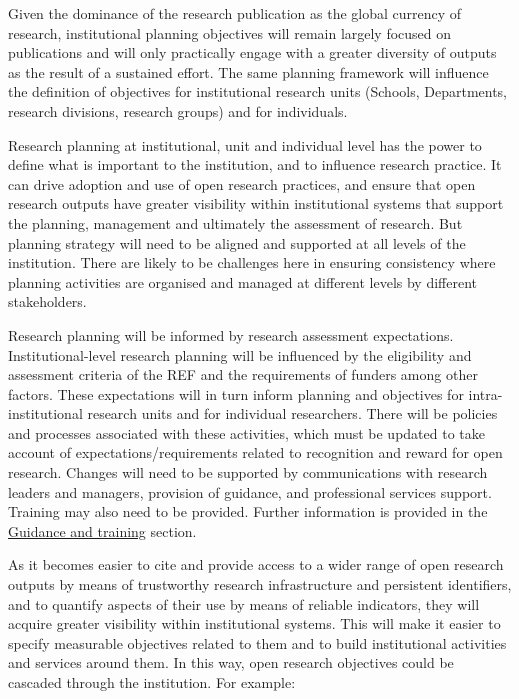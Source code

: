 \documentclass[
  letterpaper,
  DIV=11,
  numbers=noendperiod,
  oneside]{scrreprt}
\begin{document}
Given the dominance of the research publication as the global currency
of research, institutional planning objectives will remain largely
focused on publications and will only practically engage with a greater
diversity of outputs as the result of a sustained effort. The same
planning framework will influence the definition of objectives for
institutional research units (Schools, Departments, research divisions,
research groups) and for individuals.

Research planning at institutional, unit and individual level has the
power to define what is important to the institution, and to influence
research practice. It can drive adoption and use of open research
practices, and ensure that open research outputs have greater visibility
within institutional systems that support the planning, management and
ultimately the assessment of research. But planning strategy will need
to be aligned and supported at all levels of the institution. There are
likely to be challenges here in ensuring consistency where planning
activities are organised and managed at different levels by different
stakeholders.

Research planning will be informed by research assessment expectations.
Institutional-level research planning will be influenced by the
eligibility and assessment criteria of the REF and the requirements of
funders among other factors. These expectations will in turn inform
planning and objectives for intra-institutional research units and for
individual researchers. There will be policies and processes associated
with these activities, which must be updated to take account of
expectations/requirements related to recognition and reward for open
research. Changes will need to be supported by communications with
research leaders and managers, provision of guidance, and professional
services support. Training may also need to be provided. Further
information is provided in the \href{guide-07-training.qmd}{Guidance and
training} section.

As it becomes easier to cite and provide access to a wider range of open
research outputs by means of trustworthy research infrastructure and
persistent identifiers, and to quantify aspects of their use by means of
reliable indicators, they will acquire greater visibility within
institutional systems. This will make it easier to specify measurable
objectives related to them and to build institutional activities and
services around them. In this way, open research objectives could be
cascaded through the institution. For example:
\end{document}
